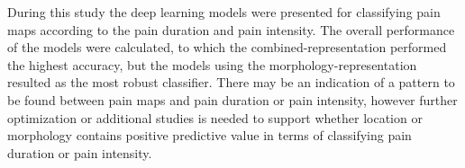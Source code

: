 During this study the deep learning models were presented for classifying pain maps according to the pain duration and pain intensity.
The overall performance of the models were calculated, to which the combined-representation performed the highest accuracy, but the models using the morphology-representation resulted as the most robust classifier. 
There may be an indication of a pattern to be found between pain maps and pain duration or pain intensity, however further optimization or additional studies is needed to support whether location or morphology contains positive predictive value in terms of classifying pain duration or pain intensity. 
